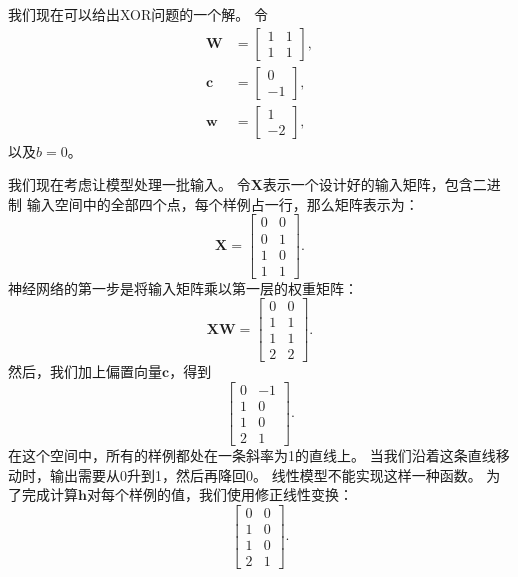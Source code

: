 

我们现在可以给出XOR问题的一个解。
令
\begin{align}
\bm{W} &= \begin{bmatrix}
1 & 1\\
1 & 1
\end{bmatrix},\\
\bm{c} &= \begin{bmatrix}
0\\
-1
\end{bmatrix},\\
\bm{w} &= \begin{bmatrix}
1\\
-2
\end{bmatrix},
\end{align}
以及$b=0$。

我们现在考虑让模型处理一批输入。
令$\bm{X}$表示一个设计好的输入矩阵，包含二进制 输入空间中的全部四个点，每个样例占一行，那么矩阵表示为：
\begin{equation} 
\bm{X} = \begin{bmatrix}
0 & 0\\
0 & 1\\ 
1 & 0\\ 
1 & 1
\end{bmatrix}. 
\end{equation} 
神经网络的第一步是将输入矩阵乘以第一层的权重矩阵： \begin{equation}
\bm{X}\bm{W} = \begin{bmatrix} 
0 & 0\\ 
1 & 1\\ 
1 & 1\\ 
2 & 2 
\end{bmatrix}.
\end{equation} 
然后，我们加上偏置向量$\bm{c}$，得到 
\begin{equation} 
\begin{bmatrix} 
0 & -1\\
1 & 0\\ 
1 & 0\\ 
2 & 1 
\end{bmatrix}. 
\end{equation}
在这个空间中，所有的样例都处在一条斜率为1的直线上。
当我们沿着这条直线移动时，输出需要从0升到1，然后再降回0。
线性模型不能实现这样一种函数。
为了完成计算$\bm{h}$对每个样例的值，我们使用修正线性变换： 
\begin{equation}
\begin{bmatrix} 
0 & 0\\ 
1 & 0\\ 
1 & 0\\ 
2 & 1 
\end{bmatrix}. 
\end{equation}

